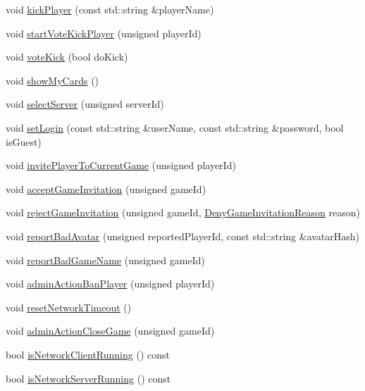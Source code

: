 \begin{DoxyCompactItemize}
void \hyperlink{class_session_a1a682edf6225afaa72df5f3d17663a35}{kick\-Player} (const std\-::string \&player\-Name)
\item 
void \hyperlink{class_session_aa834f9615a493ae739509e56abab5059}{start\-Vote\-Kick\-Player} (unsigned player\-Id)
\item 
void \hyperlink{class_session_a346c8fa2d61d205f825c2af8a12d2071}{vote\-Kick} (bool do\-Kick)
\item 
void \hyperlink{class_session_a4e99119356023629431163b20e307020}{show\-My\-Cards} ()
\item 
void \hyperlink{class_session_ae23ad66200d0c7ab81f5baddc40ad7ee}{select\-Server} (unsigned server\-Id)
\item 
void \hyperlink{class_session_a111d37566070922bebb97f1c52e811f5}{set\-Login} (const std\-::string \&user\-Name, const std\-::string \&password, bool is\-Guest)
\item 
void \hyperlink{class_session_a2dad06d98159702d5723e895d93cda01}{invite\-Player\-To\-Current\-Game} (unsigned player\-Id)
\item 
void \hyperlink{class_session_aa0083e4f35f82def3c9f05af75449caf}{accept\-Game\-Invitation} (unsigned game\-Id)
\item 
void \hyperlink{class_session_a56768c317805f6fb7f0acded7a703db3}{reject\-Game\-Invitation} (unsigned game\-Id, \hyperlink{game__defs_8h_aa91c16d80068f7d379ed63946b9d9a53}{Deny\-Game\-Invitation\-Reason} reason)
\item 
void \hyperlink{class_session_af1a1915a925b1bc73e5984524d365787}{report\-Bad\-Avatar} (unsigned reported\-Player\-Id, const std\-::string \&avatar\-Hash)
\item 
void \hyperlink{class_session_ab8c30dee4b7dd9d56045caa308bb14d6}{report\-Bad\-Game\-Name} (unsigned game\-Id)
\item 
void \hyperlink{class_session_a1343f531ff9b53c77c873f5034a00a0f}{admin\-Action\-Ban\-Player} (unsigned player\-Id)
\item 
void \hyperlink{class_session_aa772e588d7f1aa1a78ff9633a6cf0e8b}{reset\-Network\-Timeout} ()
\item 
void \hyperlink{class_session_acb24746ea4c50d24d26386e7afb4befa}{admin\-Action\-Close\-Game} (unsigned game\-Id)
\item 
bool \hyperlink{class_session_a7e4c9b0b3bf8f745c22c4f17c365d9ec}{is\-Network\-Client\-Running} () const 
\item 
bool \hyperlink{class_session_a7ac2f5a1bf47626a9b37c739701f84bf}{is\-Network\-Server\-Running} () const 

\end{DoxyCompactItemize}
